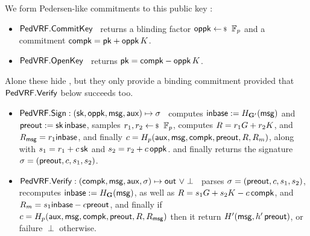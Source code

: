\noindent We form Pedersen-like commitments to this public key \pk:
\begin{itemize}
\item ${\mathsf{PedVRF}}.{\mathsf{CommitKey}}$ \,
returns a blinding factor $\openpk \leftsample \F_p$
and a commitment $\mathsf{compk} = \mathsf{pk} + \mathsf{oppk} \, K$.
\item ${\mathsf{PedVRF}}.{\mathsf{OpenKey}}$ \,
returns $\mathsf{pk} = \mathsf{compk} - \mathsf{oppk} \, K$.
\end{itemize}
Alone these hide \pk, but they only provide a binding commitment
provided that ${\mathsf{PedVRF}}.{\mathsf{Verify}}$ below succeeds too.

\begin{itemize}
\item ${\mathsf{PedVRF}}.{\mathsf{Sign}} : (\mathsf{sk},\mathsf{oppk},\mathsf{msg},\mathsf{aux}) \mapsto \sigma$ \,
    computes ${\mathsf{inbase}} := H_{{\mathbf{G}}'}(\mathsf{msg})$ and ${\mathsf{preout}} := \mathsf{sk} \, {\mathsf{inbase}}$,
    samples $r_1,r_2 \leftsample \F_p$,
    computes $R = r_1 G + r_2 K$, and $R_\mathsf{msg} = r_1 {\mathsf{inbase}}$, and
    finally $c = H_p(\mathsf{aux},\mathsf{msg},\mathsf{compk},{\mathsf{preout}},R,R_m)$,
     along with $s_1 = r_1 + c \, \mathsf{sk}$ and $s_2 = r_2 + c \, \mathsf{oppk}$.
    and finally returns the signature $\sigma = ({\mathsf{preout}},c,s_1,s_2)$.
\item ${\mathsf{PedVRF}}.{\mathsf{Verify}} : (\mathsf{compk},\mathsf{msg},\mathsf{aux},\sigma) \mapsto {\ensuremath{\mathsf{out}}} \,\, \lor \perp$ \,
    parses $\sigma = ({\mathsf{preout}},c,s_1,s_2)$, 
    recomputes ${\mathsf{inbase}} := H_{{\mathbf{G}}}(\mathsf{msg})$, as well as
    $R = s_1 G + s_2 K - c \, \mathsf{compk}$, and
    $R_m = s_1 {\mathsf{inbase}} - c {\mathsf{preout}}$, and finally
    if $c = H_p(\mathsf{aux},\mathsf{msg},\mathsf{compk},{\mathsf{preout}},R,R_\mathsf{msg})$ then it return $H'(\mathsf{msg}, h' \, {\mathsf{preout}})$, 
         or failure $\perp$ otherwise.
\end{itemize}

